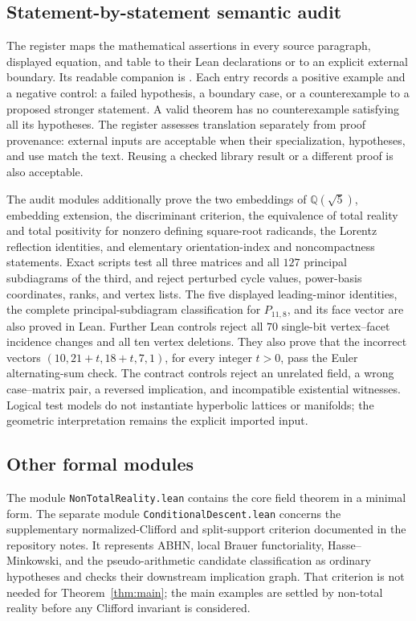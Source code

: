 \documentclass[11pt]{article}
\numberwithin{equation}{section}
\theoremstyle{definition}
\theoremstyle{remark}
\newcommand{\Q}{\mathbb{Q}}
\newcommand{\code}[1]{\texttt{#1}}
\begin{document}
\subsection{Statement-by-statement semantic audit}

The register  maps the mathematical
assertions in every source paragraph, displayed equation, and table to
their Lean declarations or to an explicit external boundary.  Its readable
companion is .  Each entry records a
positive example and a negative control: a failed hypothesis, a boundary
case, or a counterexample to a proposed stronger statement.  A valid
theorem has no counterexample satisfying all its hypotheses.  The register
assesses translation separately from proof provenance: external inputs are
acceptable when their specialization, hypotheses, and use match the text.
Reusing a checked library result or a different proof is also acceptable.

The audit modules additionally prove the two embeddings of \(\Q(\sqrt5)\),
embedding extension, the discriminant criterion, the equivalence of total
reality and total positivity for nonzero defining square-root radicands,
the Lorentz reflection identities, and elementary
orientation-index and noncompactness statements.  Exact scripts test all
three matrices and all \(127\) principal subdiagrams of the third, and reject
perturbed cycle values, power-basis coordinates, ranks, and vertex lists.
The five displayed leading-minor identities, the complete principal-subdiagram
classification for \(P_{11,8}\), and its face vector are also proved in Lean.
Further Lean controls reject all \(70\) single-bit vertex--facet incidence
changes and all ten vertex deletions.  They also prove that the incorrect
vectors \((10,21+t,18+t,7,1)\), for every integer \(t>0\), pass the Euler
alternating-sum check.
The contract controls reject an unrelated field, a wrong case--matrix pair,
a reversed implication, and incompatible existential witnesses.  Logical
test models do not instantiate hyperbolic lattices or manifolds; the
geometric interpretation remains the explicit imported input.

\subsection{Other formal modules}

The module \code{NonTotalReality.lean} contains the core field theorem in a
minimal form.  The separate module \code{ConditionalDescent.lean} concerns
the supplementary normalized-Clifford and split-support criterion documented
in the repository notes.  It represents ABHN, local Brauer functoriality,
Hasse--Minkowski, and the pseudo-arithmetic candidate classification as
ordinary hypotheses and checks their downstream implication graph.  That
criterion is not needed for Theorem~\ref{thm:main}; the main examples are
settled by non-total reality before any Clifford invariant is considered.
\end{document}
